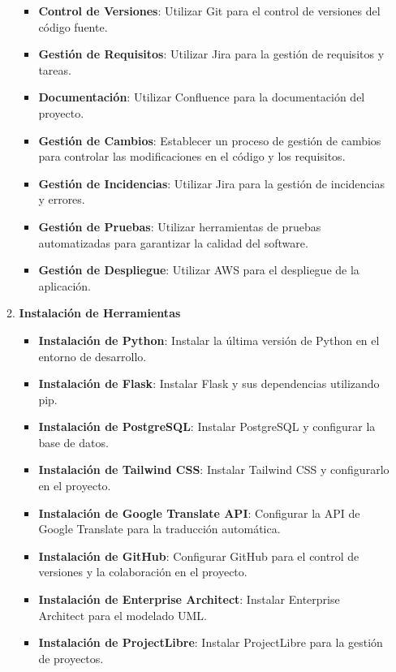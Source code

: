 \begin{doublespace}
\begin{enumerate}[label=\alph*)]
\begin{enumerate}
        \begin{itemize}
            \item \textbf{Control de Versiones}: Utilizar Git para el control de versiones del código fuente.
            \item \textbf{Gestión de Requisitos}: Utilizar Jira para la gestión de requisitos y tareas.
            \item \textbf{Documentación}: Utilizar Confluence para la documentación del proyecto.
            \item \textbf{Gestión de Cambios}: Establecer un proceso de gestión de cambios para controlar las modificaciones en el código y los requisitos.
            \item \textbf{Gestión de Incidencias}: Utilizar Jira para la gestión de incidencias y errores.
            \item \textbf{Gestión de Pruebas}: Utilizar herramientas de pruebas automatizadas para garantizar la calidad del software.
            \item \textbf{Gestión de Despliegue}: Utilizar AWS para el despliegue de la aplicación.
        \end{itemize}
        \item \textbf{Instalación de Herramientas}\par
        \begin{itemize}
            \item \textbf{Instalación de Python}: Instalar la última versión de Python en el entorno de desarrollo.
            \item \textbf{Instalación de Flask}: Instalar Flask y sus dependencias utilizando pip.
            \item \textbf{Instalación de PostgreSQL}: Instalar PostgreSQL y configurar la base de datos.
            \item \textbf{Instalación de Tailwind CSS}: Instalar Tailwind CSS y configurarlo en el proyecto.
            \item \textbf{Instalación de Google Translate API}: Configurar la API de Google Translate para la traducción automática.
            \item \textbf{Instalación de GitHub}: Configurar GitHub para el control de versiones y la colaboración en el proyecto.
            \item \textbf{Instalación de Enterprise Architect}: Instalar Enterprise Architect para el modelado UML.
            \item \textbf{Instalación de ProjectLibre}: Instalar ProjectLibre para la gestión de proyectos.

\end{itemize}
\end{enumerate}
\end{enumerate}
\end{doublespace}
